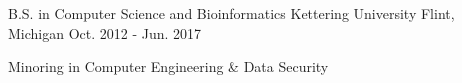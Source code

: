 

\begin{cventries}



  \cventry
    {B.S. in Computer Science and Bioinformatics} %
    {Kettering University} %
    {Flint, Michigan} %
    {Oct. 2012 - Jun. 2017} %
    {
      \begin{cvitems} %
        \item {Minoring in Computer Engineering \& Data Security}
      \end{cvitems}
    }

\end{cventries}
